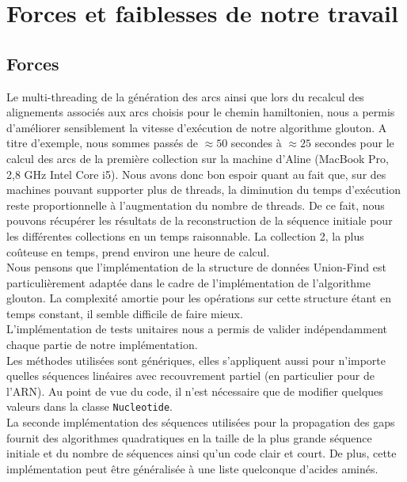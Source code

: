 
\section{Forces et faiblesses de notre travail}

\subsection{Forces}

Le multi-threading de la génération des arcs ainsi que lors du recalcul des alignements associés aux arcs choisis pour le chemin hamiltonien, nous a permis d'améliorer sensiblement la vitesse d'exécution de notre algorithme glouton. A titre d'exemple, nous sommes passés de $\approx 50$ secondes à $\approx 25$ secondes pour le calcul des arcs de la première collection sur la machine d'Aline (MacBook Pro, 2,8 GHz Intel Core i5). Nous avons donc bon espoir quant au fait que, sur des machines pouvant supporter plus de threads, la diminution du temps d'exécution reste proportionnelle à l'augmentation du nombre de threads. De ce fait, nous pouvons récupérer les résultats de la reconstruction de la séquence initiale pour les différentes collections en un temps raisonnable. La collection 2, la plus coûteuse en temps, prend environ une heure de calcul.\\

Nous pensons que l'implémentation de la structure de données Union-Find est particulièrement adaptée dans le cadre de l'implémentation de l'algorithme glouton. La complexité amortie pour les opérations sur cette structure étant en temps constant, il semble difficile de faire mieux.\\

L'implémentation de tests unitaires nous a permis de valider indépendamment chaque partie de notre implémentation.\\

Les méthodes utilisées sont génériques, elles s'appliquent aussi pour n'importe quelles séquences linéaires avec recouvrement partiel (en particulier pour de l'ARN). Au point de vue du code, il n'est nécessaire que de modifier quelques valeurs dans la classe \verb|Nucleotide|.\\

La seconde implémentation des séquences utilisées pour la propagation des gaps
fournit des algorithmes quadratiques en la taille de la plus grande séquence initiale et
du nombre de séquences ainsi qu'un code clair et court. De plus, cette
implémentation peut être généralisée à une liste quelconque d'acides aminés.


